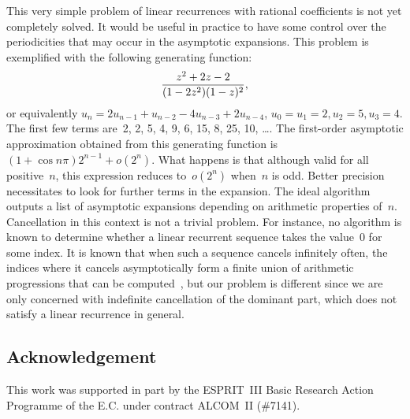    This very simple problem of linear
recurrences with rational coefficients is not yet completely solved.
It would be useful in practice to have some control over the
periodicities that may occur in the asymptotic expansions. This
problem  is  exemplified with the following generating 
function:     \[{z^2+2z-2\over(1-2z^2)(1-z)^2},\]  or     equivalently
$u_n=2u_{n-1}+u_{n-2}-4u_{n-3}+2u_{n-4}$,
$u_0=u_1=2,u_2=5,u_3=4$. The first few terms are~2, 2, 5, 4, 9, 6, 15,
8, 25,  10, \dots.  The  first-order asymptotic approximation obtained
from this generating function is~$(1+\cos n\pi)2^{n-1}+o(2^n)$. What
happens is that although  valid for  all positive~$n$, this expression
reduces to~$o(2^n)$ when~$n$ is odd.  Better precision necessitates to
look for further terms in the expansion. The ideal algorithm outputs a
list of asymptotic expansions depending on arithmetic properties
of~$n$.  Cancellation in this context
is not a  trivial problem. For  instance, no
algorithm  is known  to determine  whether a linear recurrent
sequence takes the value~0  for
some  index. It is known that when such a sequence cancels infinitely
often, the indices where it cancels asymptotically form a finite union
of arithmetic progressions that can be computed~\cite{BeMi76}, but our
problem is different since we are only 
concerned with indefinite cancellation of the dominant part, which
does not satisfy a linear recurrence in general.

\subsection*{Acknowledgement}
This work was supported in part by the ESPRIT~III
Basic Research Action Programme of the
E.C. under contract ALCOM~II (\#7141).

